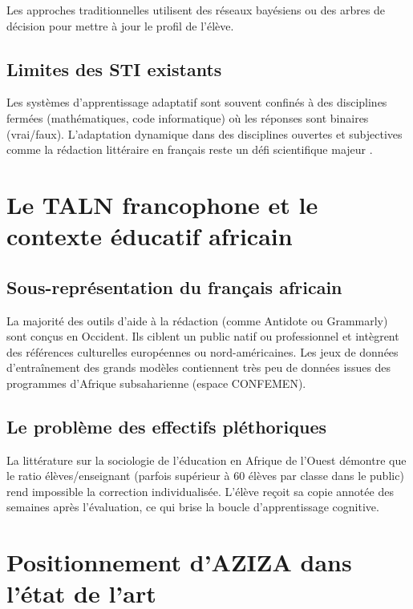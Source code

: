 Les approches traditionnelles utilisent des réseaux bayésiens ou des arbres de décision \cite{conati2002} pour mettre à jour le profil de l'élève.

\subsection{Limites des STI existants}

Les systèmes d'apprentissage adaptatif sont souvent confinés à des disciplines fermées (mathématiques, code informatique) où les réponses sont binaires (vrai/faux). L'adaptation dynamique dans des disciplines ouvertes et subjectives comme la rédaction littéraire en français reste un défi scientifique majeur \cite{zawacki2019}.

\section{Le TALN francophone et le contexte éducatif africain}

\subsection{Sous-représentation du français africain}

La majorité des outils d'aide à la rédaction (comme Antidote ou Grammarly) sont conçus en Occident. Ils ciblent un public natif ou professionnel et intègrent des références culturelles européennes ou nord-américaines. Les jeux de données d'entraînement des grands modèles contiennent très peu de données issues des programmes d'Afrique subsaharienne (espace CONFEMEN).

\subsection{Le problème des effectifs pléthoriques}

La littérature sur la sociologie de l'éducation en Afrique de l'Ouest \cite{akpo2020} démontre que le ratio élèves/enseignant (parfois supérieur à 60 élèves par classe dans le public) rend impossible la correction individualisée. L'élève reçoit sa copie annotée des semaines après l'évaluation, ce qui brise la boucle d'apprentissage cognitive.

\section{Positionnement d'AZIZA dans l'état de l'art}

